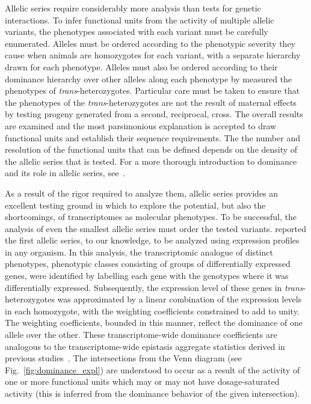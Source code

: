 Allelic series require considerably more analysis than tests for genetic
interactions. To infer functional units from the activity of multiple allelic
variants, the phenotypes associated with each variant must be carefully
enumerated. Alleles must be ordered according to the phenotypic severity they
cause when animals are homozygotes for each variant, with a separate hierarchy
drawn for each phenotype. Alleles must also be ordered according to their
dominance hierarchy over other alleles along each phenotype by measured the
phenotypes of \emph{trans}-heterozygotes. Particular care must be taken to
ensure that the phenotypes of the \emph{trans}-heterozygotes are not the result
of maternal effects by testing progeny generated from a second, reciprocal,
cross. The overall results are examined and the most parsimonious explanation is
accepted to draw functional units and establish their sequence requirements. The
the number and resolution of the functional units that can be defined depends on
the density of the allelic series that is tested. For a more thorough
introduction to dominance and its role in allelic series, see~\citet{Yook2005}.

As a result of the rigor required to analyze them, allelic series provides an
excellent testing ground in which to explore the potential, but also the
shortcomings, of transcriptomes as molecular phenotypes. To be successful, the
analysis of even the smallest allelic series must order the tested variants.
\citet{Angeles-Albores2018b} reported the first allelic series, to our
knowledge, to be analyzed using expression profiles in any organism. In this
analysis, the transcriptomic analogue of distinct phenotypes, phenotypic classes
consisting of groups of differentially expressed genes, were identified by
labelling each gene with the genotypes where it was differentially expressed.
Subsequently, the expression level of these genes in \emph{trans}-heterozygotes
was approximated by a linear combination of the expression levels in each
homozygote, with the weighting coefficients constrained to add to unity. The
weighting coefficients, bounded in this manner, reflect the dominance of one
allele over the other. These transcriptome-wide dominance coefficients are
analogous to the transcriptome-wide epistasis aggregate statistics derived in
previous studies~\citep{Angeles-Albores2018}. The intersections from the Venn
diagram (see Fig.~\ref{fig:dominance_expl}) are understood to occur as a result
of the activity of one or more functional units which may or may not have
dosage-saturated activity (this is inferred from the dominance behavior of
the given intersection).

